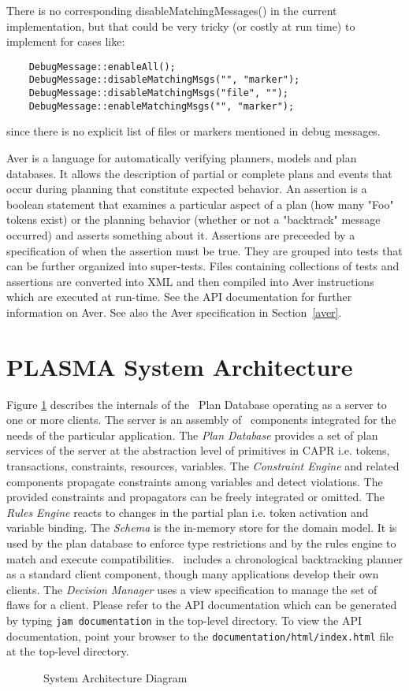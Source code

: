 \documentclass[10pt, letterpaper, twoside]{article}
\begin{document}
There is no corresponding disableMatchingMessages() in the current
implementation, but that could be very tricky (or costly at run time)
to implement for cases like:
\begin{verbatim}
	DebugMessage::enableAll();
	DebugMessage::disableMatchingMsgs("", "marker");
	DebugMessage::disableMatchingMsgs("file", "");
	DebugMessage::enableMatchingMsgs("", "marker");
\end{verbatim}
since there is no explicit list of files or markers mentioned in
debug messages.

Aver is a language for automatically verifying planners, models and plan
databases. It allows the description of partial or complete plans and
events that occur during planning that constitute expected behavior.  An
assertion is a boolean statement that examines a particular aspect of a
plan (how many "Foo" tokens exist) or the planning behavior (whether or not
a "backtrack" message occurred) and asserts something about it. Assertions
are preceeded by a specification of when the assertion must be true. They
are grouped into tests that can be further organized into
super-tests. Files containing collections of tests and assertions are
converted into XML and then compiled into Aver instructions which are
executed at run-time.  See the API documentation for further information on
Aver.  See also the Aver specification in Section~\ref{aver}.

\section{PLASMA System Architecture}

Figure \ref{SystemDiagram} describes the internals of the \ET\, Plan
Database operating as a server to one or more clients. The server is an
assembly of \ET\, components integrated for the needs of the particular
application. The {\em Plan Database} provides a set of plan services of the
server at the abstraction level of primitives in CAPR i.e. tokens,
transactions, constraints, resources, variables. The {\em Constraint
Engine} and related components propagate constraints among
variables and detect violations. The provided constraints and
propagators can be freely integrated or omitted. The {\em Rules Engine}
reacts to changes in the partial plan i.e. token activation and variable
binding. The {\em Schema} is the in-memory store for the domain model. It
is used by the plan database to enforce type restrictions and by the rules
engine to match and execute compatibilities.  \ET\, includes a chronological
backtracking planner as a standard client component, though many
applications develop their own clients. The {\em Decision Manager} uses a
view specification to manage the set of flaws for a client.  Please refer
to the API documentation which can be generated by typing {\tt jam
documentation} in the top-level directory.  To view the API documentation,
point your browser to the {\tt documentation/html/index.html} file at the
top-level directory.
\begin{figure}[t]
\centering{}
\caption{\ET\, System Architecture Diagram}
\label{SystemDiagram}
\end{figure}
\end{document}
